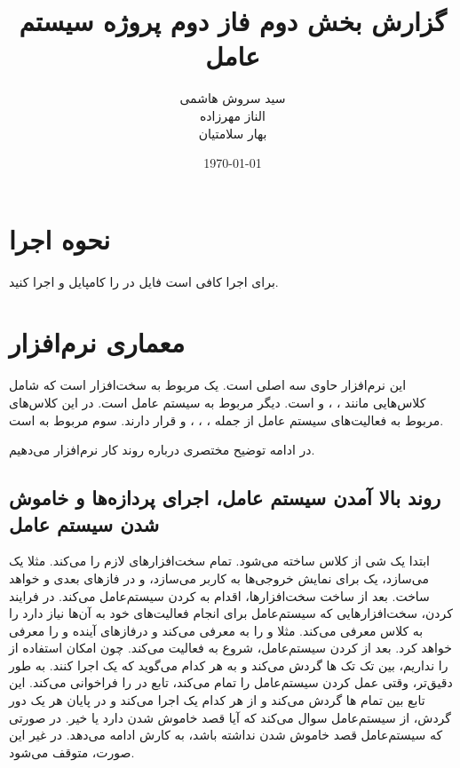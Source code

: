 \documentclass{article}
\title{گزارش بخش دوم فاز دوم پروژه سیستم عامل}
\author{سید سروش هاشمی\\الناز مهرزاده\\بهار سلامتیان}
\date{\today}
\begin{document}
\maketitle
\section{نحوه اجرا}
برای اجرا کافی است فایل 
در 
را کامپایل و اجرا کنید. 
\section{معماری نرم‌افزار}
این نرم‌افزار حاوی سه 
اصلی است. یک 
مربوط به سخت‌افزار است که شامل کلاس‌هایی مانند 
، 
، 
و
است. 
دیگر مربوط به سیستم عامل است. در این 
کلاس‌های مربوط به فعالیت‌های سیستم عامل از جمله 
، 
، 
، 
و
قرار دارند. 
سوم مربوط به 
است. 

در ادامه  توضیح مختصری درباره روند کار نرم‌افزار می‌دهیم. 

\subsection{روند بالا آمدن سیستم عامل، اجرای پردازه‌ها و خاموش شدن سیستم عامل}
ابتدا یک شی از کلاس 
ساخته می‌شود. 
تمام سخت‌افزارهای لازم را 
می‌کند. مثلا یک 
می‌سازد، یک 
برای نمایش خروجی‌ها به کاربر می‌سازد، و در فازهای بعدی 
و 
خواهد ساخت. بعد از ساخت سخت‌افزارها، اقدام به 
کردن سیستم‌عامل می‌کند. در فرایند 
کردن، سخت‌افزارهایی که سیستم‌عامل برای انجام فعالیت‌های خود به آن‌ها نیاز دارد را به کلاس 
معرفی می‌کند. مثلا 
و 
را به 
معرفی می‌کند و درفازهای آینده 
و 
را معرفی خواهد کرد. بعد از 
کردن سیستم‌عامل، 
شروع به فعالیت می‌کند. چون امکان استفاده از 
را نداریم، 
بین تک تک 
ها گردش می‌کند و به هر کدام می‌گوید که یک 
اجرا کنند. به طور دقیق‌تر، وقتی 
عمل 
کردن سیستم‌عامل را تمام می‌کند، تابع 
در 
را فراخوانی می‌کند. این تابع بین تمام 
ها گردش می‌کند و از هر کدام یک 
اجرا می‌کند و در پایان هر یک دور گردش، از سیستم‌عامل سوال می‌کند که آیا قصد خاموش شدن دارد یا خیر. در صورتی که سیستم‌عامل قصد خاموش شدن نداشته باشد، 
به کارش ادامه می‌دهد. در غیر این صورت، 
متوقف می‌شود. 
\end{document}
